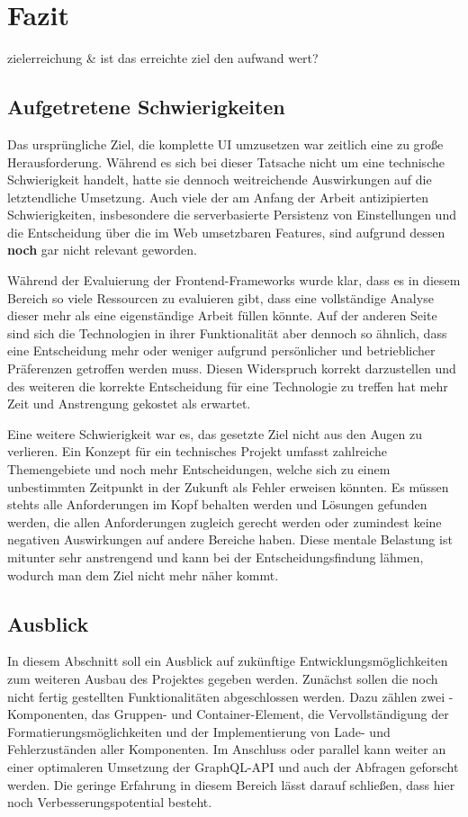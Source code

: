 \chapter{Fazit}\label{chap:conclusion}
zielerreichung \& ist das erreichte ziel den aufwand wert?

\section{Aufgetretene Schwierigkeiten}
Das ursprüngliche Ziel, die komplette UI umzusetzen war zeitlich eine zu große Herausforderung. Während es sich bei dieser Tatsache nicht um eine technische Schwierigkeit handelt, hatte sie dennoch weitreichende Auswirkungen auf die letztendliche Umsetzung. Auch viele der am Anfang der Arbeit antizipierten Schwierigkeiten, insbesondere die serverbasierte Persistenz von Einstellungen und die Entscheidung über die im Web umsetzbaren Features, sind aufgrund dessen \textbf{noch} gar nicht relevant geworden.

Während der Evaluierung der Frontend-Frameworks wurde klar, dass es in diesem Bereich so viele Ressourcen zu evaluieren gibt, dass eine vollständige Analyse dieser mehr als eine eigenständige Arbeit füllen könnte. Auf der anderen Seite sind sich die Technologien in ihrer Funktionalität aber dennoch so ähnlich, dass eine Entscheidung mehr oder weniger aufgrund persönlicher und betrieblicher Präferenzen getroffen werden muss. Diesen Widerspruch korrekt darzustellen und des weiteren die korrekte Entscheidung für eine Technologie zu treffen hat mehr Zeit und Anstrengung gekostet als erwartet.

Eine weitere Schwierigkeit war es, das gesetzte Ziel nicht aus den Augen zu verlieren. Ein Konzept für ein technisches Projekt umfasst zahlreiche Themengebiete und noch mehr Entscheidungen, welche sich zu einem unbestimmten Zeitpunkt in der Zukunft als Fehler erweisen könnten. Es müssen stehts alle Anforderungen im Kopf behalten werden und Lösungen gefunden werden, die allen Anforderungen zugleich gerecht werden oder zumindest keine negativen Auswirkungen auf andere Bereiche haben. Diese mentale Belastung ist mitunter sehr anstrengend und kann bei der Entscheidungsfindung lähmen, wodurch man dem Ziel nicht mehr näher kommt.

\section{Ausblick}
In diesem Abschnitt soll ein Ausblick auf zukünftige Entwicklungsmöglichkeiten zum weiteren Ausbau des Projektes gegeben werden. Zunächst sollen die noch nicht fertig gestellten Funktionalitäten abgeschlossen werden. Dazu zählen zwei -Komponenten, das Gruppen- und Container-Element, die Vervollständigung der Formatierungsmöglichkeiten und der Implementierung von Lade- und Fehlerzuständen aller Komponenten.
Im Anschluss oder parallel kann weiter an einer optimaleren Umsetzung der GraphQL-API und auch der Abfragen geforscht werden. Die geringe Erfahrung in diesem Bereich lässt darauf schließen, dass hier noch Verbesserungspotential besteht.

